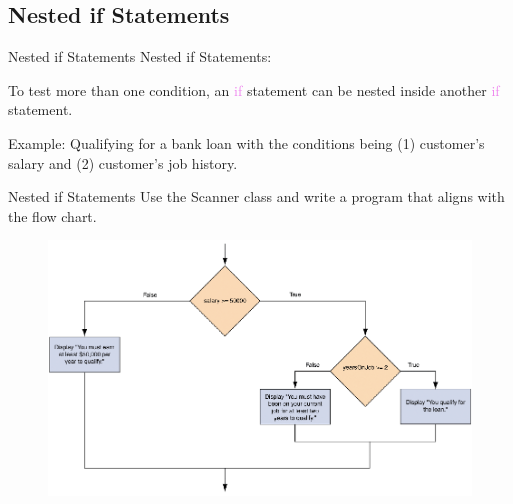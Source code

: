 \documentclass[11pt]{beamer}
\newcommand{\violet}[1]{\textcolor{violet}{#1}}
\begin{document}
\subsection{Nested if Statements}
\begin{frame}{Nested if Statements}
    Nested if Statements:
    \begin{center}
        To test more than one condition, an \violet{if} statement can be nested inside another \violet{if} statement.
    \end{center}

    Example:
    Qualifying for a bank loan with the conditions being (1) customer's salary and (2) customer's job history.
\end{frame}

\begin{frame}{Nested if Statements}
    Use the Scanner class and write a program that aligns with the flow chart.
        \noindent 
        \begin{figure}[H]
        \centering
        \includegraphics[scale=0.3]{Images/chapter03_nestedIf.png}
        \end{figure}
\end{frame}
\end{document}

